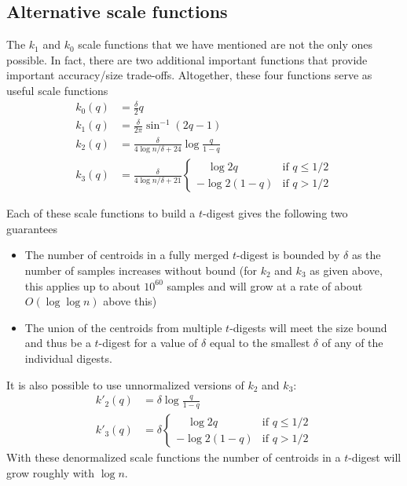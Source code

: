 \documentclass[11pt]{amsart}
\begin{document}
\subsection{Alternative scale functions}
The $k_1$ and $k_0$ scale functions that we have mentioned are not the only ones possible. In fact, there are two additional important functions that provide important accuracy/size trade-offs. Altogether, these four functions serve as useful scale functions
\[
\begin{aligned}
k_0(q) &= \frac \delta 2 q \\
k_1(q) &= \frac \delta {2\pi}  \sin^{-1}(2q-1)   \\
k_2(q) &= \frac \delta {4 \log n/\delta + 24} \log {\frac q {1-q}} \\
k_3(q) &= \frac \delta {4\log n/\delta + 21}\begin{cases}
\quad \log 2q & \text{if  } q \le 1/2 \\
- \log 2(1-q) & \text{if  } q > 1/2
\end{cases}
\end{aligned}
\]

Each of these scale functions to build a $t$-digest gives the following two guarantees
\begin{itemize}
\item
The number of centroids in a fully merged $t$-digest is bounded by $\delta$ as the number of samples increases without bound (for $k_2$ and $k_3$ as given above, this applies up to about $10^60$ samples and will grow at a rate of about $O(\log \log n)$ above this)
\item
The union of the centroids from multiple $t$-digests will meet the size bound and thus be a $t$-digest for a value of $\delta$ equal to the smallest $\delta$ of any of the individual digests.
\end{itemize}

It is also possible to use unnormalized versions of $k_2$ and $k_3$:
\[
\begin{aligned}
k'_2(q) &=  \delta  \log {\frac q {1-q}} \\
k'_3(q) &=  \delta \begin{cases}
\quad \log 2q & \text{if  } q \le 1/2 \\
- \log 2(1-q) & \text{if  } q > 1/2
\end{cases}
\end{aligned}
\]
With these denormalized scale functions the number of centroids in a $t$-digest will grow roughly with $\log n$.
\end{document}
